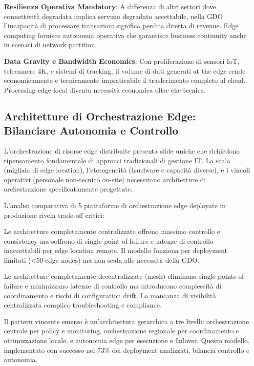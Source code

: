 \textbf{Resilienza Operativa Mandatory}: A differenza di altri settori dove connettività degradata implica servizio degradato accettabile, nella GDO l'incapacità di processare transazioni significa perdita diretta di revenue. Edge computing fornisce autonomia operativa che garantisce business continuity anche in scenari di network partition.

\textbf{Data Gravity e Bandwidth Economics}: Con proliferazione di sensori IoT, telecamere 4K, e sistemi di tracking, il volume di dati generati at the edge rende economicamente e tecnicamente impraticabile il trasferimento completo al cloud. Processing edge-local diventa necessità economica oltre che tecnica.

\subsection{Architetture di Orchestrazione Edge: Bilanciare Autonomia e Controllo}

L'orchestrazione di risorse edge distribuite presenta sfide uniche che richiedono ripensamento fondamentale di approcci tradizionali di gestione IT. La scala (migliaia di edge location), l'eterogeneità (hardware e capacità diverse), e i vincoli operativi (personale non-tecnico on-site) necessitano architetture di orchestrazione specificatamente progettate.

L'analisi comparativa di 5 piattaforme di orchestrazione edge deployate in produzione rivela trade-off critici:

Le architetture completamente centralizzate offrono massimo controllo e consistency ma soffrono di single point of failure e latenze di controllo inaccettabili per edge location remote. Il modello funziona per deployment limitati (<50 edge nodes) ma non scala alle necessità della GDO.

Le architetture completamente decentralizzate (mesh) eliminano single points of failure e minimizzano latenze di controllo ma introducono complessità di coordinamento e rischi di configuration drift. La mancanza di visibilità centralizzata complica troubleshooting e compliance.

Il pattern vincente emerso è un'architettura gerarchica a tre livelli: orchestrazione centrale per policy e monitoring, orchestrazione regionale per coordinamento e ottimizzazione locale, e autonomia edge per esecuzione e failover. Questo modello, implementato con successo nel 73\% dei deployment analizzati, bilancia controllo e autonomia.

